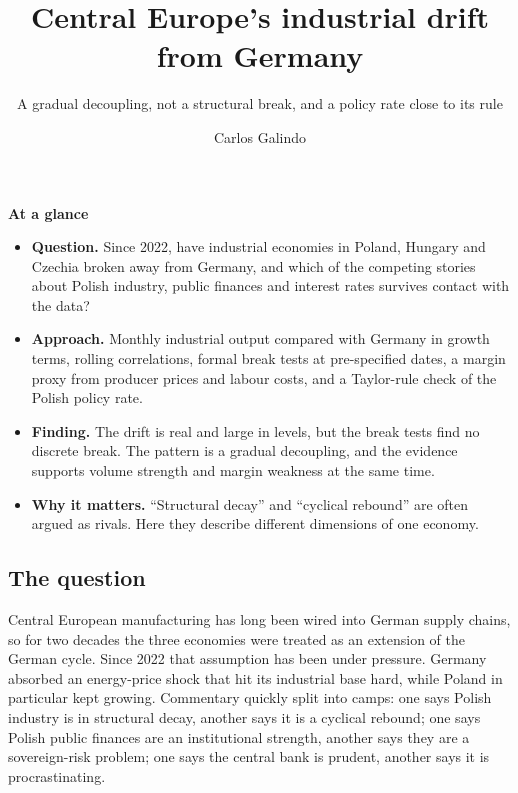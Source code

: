 \documentclass[
  british,
  a4paper,
]{article}
\title{Central Europe's industrial drift from Germany}
\subtitle{A gradual decoupling, not a structural break, and a policy
rate close to its rule}
\author{Carlos Galindo}
\date{}
\providecommand{\tightlist}{%
  \setlength{\itemsep}{0pt}\setlength{\parskip}{0pt}}
\begin{document}
\maketitle


\begin{tcolorbox}[enhanced jigsaw, arc=.35mm, bottomrule=.15mm, breakable, colback=white, colframe=quarto-callout-note-color-frame, left=2mm, leftrule=.75mm, opacityback=0, rightrule=.15mm, toprule=.15mm]

\vspace{-3mm}\textbf{At a glance}\vspace{3mm}

\begin{itemize}
\tightlist
\item
  \textbf{Question.} Since 2022, have industrial economies in Poland,
  Hungary and Czechia broken away from Germany, and which of the
  competing stories about Polish industry, public finances and interest
  rates survives contact with the data?
\item
  \textbf{Approach.} Monthly industrial output compared with Germany in
  growth terms, rolling correlations, formal break tests at
  pre-specified dates, a margin proxy from producer prices and labour
  costs, and a Taylor-rule check of the Polish policy rate.
\item
  \textbf{Finding.} The drift is real and large in levels, but the break
  tests find no discrete break. The pattern is a gradual decoupling, and
  the evidence supports volume strength and margin weakness at the same
  time.
\item
  \textbf{Why it matters.} ``Structural decay'' and ``cyclical rebound''
  are often argued as rivals. Here they describe different dimensions of
  one economy.
\end{itemize}

\end{tcolorbox}

\subsection{The question}\label{the-question}

Central European manufacturing has long been wired into German supply
chains, so for two decades the three economies were treated as an
extension of the German cycle. Since 2022 that assumption has been under
pressure. Germany absorbed an energy-price shock that hit its industrial
base hard, while Poland in particular kept growing. Commentary quickly
split into camps: one says Polish industry is in structural decay,
another says it is a cyclical rebound; one says Polish public finances
are an institutional strength, another says they are a sovereign-risk
problem; one says the central bank is prudent, another says it is
procrastinating.
\end{document}
